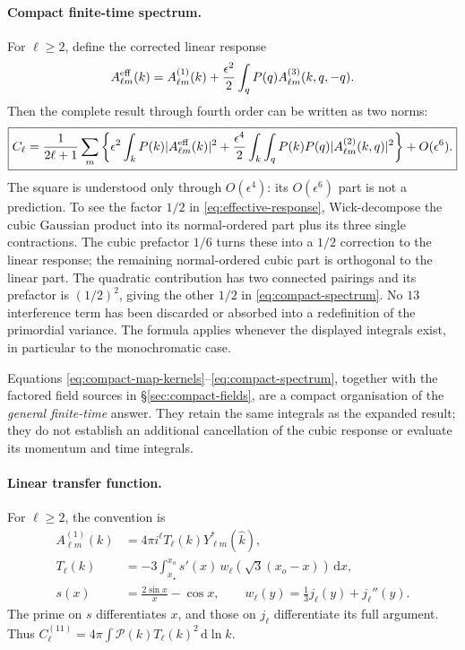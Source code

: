\documentclass[11pt]{article}
\theoremstyle{definition}
\theoremstyle{remark}
\newcommand{\eps}{\epsilon}
\newcommand{\dd}{\mathrm{d}}
\begin{document}
\paragraph{Compact finite-time spectrum.}
For $\ell\ge2$, define the corrected linear response
\begin{equation}\label{eq:effective-response}
A^{\rm eff}_{\ell m}(k)=A^{(1)}_{\ell m}(k)
+\frac{\eps^2}{2}\int_qP(q)A^{(3)}_{\ell m}(k,q,-q).
\end{equation}
Then the complete result through fourth order can be written as two norms:
\begin{equation}\label{eq:compact-spectrum}
\boxed{\displaystyle
C_\ell=\frac1{2\ell+1}\sum_m\left\{
\eps^2\int_kP(k)|A^{\rm eff}_{\ell m}(k)|^2
+\frac{\eps^4}{2}\int_k\int_qP(k)P(q)|A^{(2)}_{\ell m}(k,q)|^2
\right\}+O(\eps^6).}
\end{equation}
The square is understood only through $O(\eps^4)$: its $O(\eps^6)$ part is not a prediction.
To see the factor $1/2$ in \eqref{eq:effective-response}, Wick-decompose the cubic Gaussian
product into its normal-ordered part plus its three single contractions. The cubic
prefactor $1/6$ turns these into a $1/2$ correction to the linear response; the remaining
normal-ordered cubic part is orthogonal to the linear part. The quadratic contribution has
two connected pairings and its prefactor is $(1/2)^2$, giving the other $1/2$ in
\eqref{eq:compact-spectrum}. No $13$ interference term has been discarded or absorbed into a
redefinition of the primordial variance. The formula applies whenever the displayed
integrals exist, in particular to the monochromatic case.

Equations \eqref{eq:compact-map-kernels}--\eqref{eq:compact-spectrum}, together with the
factored field sources in \S\ref{sec:compact-fields}, are a compact organisation of the
\emph{general finite-time} answer. They retain the same integrals as the expanded result;
they do not establish an additional cancellation of the cubic response or evaluate its
momentum and time integrals.

\paragraph{Linear transfer function.}
For $\ell\ge2$, the convention is
\begin{equation}\label{eq:linear-transfer}
\begin{aligned}
A^{(1)}_{\ell m}(k)&=4\pi i^\ell T_\ell(k)Y_{\ell m}^*(\hat k),\\
T_\ell(k)&=-3\int_{x_\star}^{x_o}s'(x)\,
 w_\ell\!\left(\sqrt3(x_o-x)\right)\,\dd x,\\
s(x)&=\frac{2\sin x}{x}-\cos x,\qquad
w_\ell(y)=\frac13j_\ell(y)+j_\ell''(y).
\end{aligned}
\end{equation}
The prime on $s$ differentiates $x$, and those on $j_\ell$ differentiate its full argument.
Thus $C_\ell^{(11)}=4\pi\int\mathcal P(k)T_\ell(k)^2\,\dd\ln k$.
\end{document}
